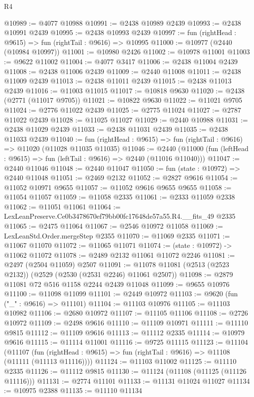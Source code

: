 \begin{lexlean}{R4}
\begin{coremodule}
@10989 := @4077 @10988
@10991 := @2438 @10989 @2439
@10993 := @2438 @10991 @2439
@10995 := @2438 @10993 @2439
@10997 := fun (rightHead : @9615) => fun (rightTail : @9616) => @10995
@11000 := @10977 (@2440 (@10984 @10997))
@11001 := @10980 @2426
@11002 := @10978 @11001
@11003 := @9622 @11002
@11004 := @4077 @3417
@11006 := @2438 @11004 @2439
@11008 := @2438 @11006 @2439
@11009 := @2440 @11008
@11011 := @2438 @11009 @2439
@11013 := @2438 @11011 @2439
@11015 := @2438 @11013 @2439
@11016 := @11003 @11015
@11017 := @10818 @9630
@11020 := @2438 (@2771 (@11017 @9705))
@11021 := @10822 @9630
@11022 := @11021 @9705
@11024 := @2776 @11022 @2439
@11025 := @2775 @11024
@11027 := @2787 @11022 @2439
@11028 := @11025 @11027
@11029 := @2440 @10988
@11031 := @2438 @11029 @2439
@11033 := @2438 @11031 @2439
@11035 := @2438 @11033 @2439
@11040 := fun (rightHead : @9615) => fun (rightTail : @9616) => @11020 (@11028 @11035 @11035)
@11046 := @2440 (@11000 (fun (leftHead : @9615) => fun (leftTail : @9616) => @2440 (@11016 @11040)))
@11047 := @2440 @11046
@11048 := @2440 @11047
@11050 := fun (state : @10972) => @2440 @11048
@11051 := @2469 @2132
@11052 := @2827 @9616
@11054 := @11052 @10971 @9655
@11057 := @11052 @9616 @9655 @9655
@11058 := @11054 @11057
@11059 := @11058 @2335
@11061 := @2333 @11059 @2338
@11062 := @11051 @11061
@11064 := LexLeanPreserve.Ce0b3478670ef79bb00fc17648de57a55.R4.__fits_49 @2335
@11065 := @2475 @11064
@11067 := @2546 @10972 @11058
@11069 := LexLeanStd.Order.mergeStep @2355
@11070 := @11069 @2335
@11071 := @11067 @11070
@11072 := @11065 @11071
@11074 := (state : @10972) -> @11062 @11072
@11078 := @2489 @2132 @11061 @11072 @2246
@11081 := @2497 (@2504 @11059) @2507
@11091 := @11078 @11081 (@2513 (@2523 @2132)) (@2529 (@2530 (@2531 @2246) @11061 @2507))
@11098 := @2879 @11081 @72 @516 @1158 @2244 @2439 @11048
@11099 := @9655 @10976
@11100 := @11098 @11099
@11101 := @2449 @10972
@11103 := @9620 (fun ("_" : @9616) => @11101)
@11104 := @11103 @10976
@11105 := @11103 @10982
@11106 := @2680 @10972
@11107 := @11105 @11106
@11108 := @2726 @10972
@11109 := @2498 @9616
@11110 := @11109 @10971
@11111 := @11110 @9815
@11112 := @11109 @9616
@11113 := @11112 @2335
@11114 := @10979 @9616
@11115 := @11114 @11001
@11116 := @9725 @11115
@11123 := @11104
    (@11107 (fun (rightHead : @9615) => fun (rightTail : @9616) => @11108 (@11111 (@11113 @11116))))
@11124 := @11103 @11002
@11125 := @11110 @2335
@11126 := @11112 @9815
@11130 := @11124 (@11108 (@11125 (@11126 @11116)))
@11131 := @2774 @11101
@11133 := @11131 @11024 @11027
@11134 := @10975 @2388
@11135 := @11110 @11134

\end{coremodule}
\end{lexlean}
